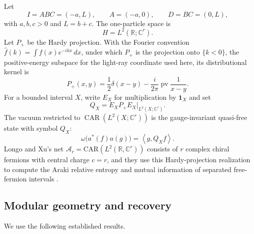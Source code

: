 \documentclass[11pt]{article}
\theoremstyle{accent}
\theoremstyle{definition}
\newcommand{\CAR}{\operatorname{CAR}}
\newcommand{\pv}{\operatorname{pv}}
\newcommand{\ip}[2]{\left\langle #1,#2\right\rangle}
\begin{document}
Let
\[
 I=ABC=(-a,L),\qquad A=(-a,0),\qquad D=BC=(0,L),
\]
with \(a,b,c>0\) and \(L=b+c\).  The one-particle space is
\[
 H=L^2(\mathbb R;\mathbb C^r).
\]
Let \(P_+\) be the Hardy projection.  With the Fourier convention \(\hat f(k)=\int f(x)e^{-ikx}\,dx\), under which \(P_+\) is the projection onto \(\{k<0\}\), the positive-energy subspace for the light-ray coordinate used here, its distributional kernel is
\begin{equation}\label{eq:hardy-kernel}
 P_+(x,y)
 =\frac12\delta(x-y)-\frac{i}{2\pi}\pv\frac1{x-y}.
\end{equation}
For a bounded interval \(X\), write \(E_X\) for multiplication by \(\mathbf 1_X\) and set
\begin{equation}\label{eq:local-symbol}
 Q_X=E_XP_+E_X\big|_{L^2(X;\mathbb C^r)}.
\end{equation}
The vacuum restricted to \(\CAR(L^2(X;\mathbb C^r))\) is the gauge-invariant quasi-free state with symbol \(Q_X\):
\begin{equation}\label{eq:qf-two-point}
 \omega\bigl(a^*(f)a(g)\bigr)=\ip{g}{Q_Xf}.
\end{equation}
Longo and Xu's net \(\mathcal A_r=\mathrm{CAR}(L^2(\mathbb R,\mathbb C^r))\) consists of \(r\) complex chiral fermions with central charge \(c=r\), and they use this Hardy-projection realization to compute the Araki relative entropy and mutual information of separated free-fermion intervals \cite{LongoXu}.

\subsection{Modular geometry and recovery}

We use the following established results.
\end{document}
